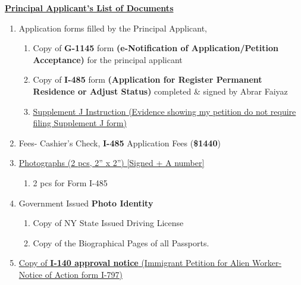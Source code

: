
\begin{center}
\underline{\textbf{Principal Applicant's List of Documents}}
\end{center}

\begin{enumerate}[label=\textbf{ Exhibit-\arabic*}]
    \item {Application forms filled by the Principal Applicant,}\begin{enumerate}[label=\roman*.]
        
        \item Copy of \textbf{G-1145} form \textbf{(e-Notification of Application/Petition Acceptance)} for the principal applicant
        
        \item Copy of \textbf{I-485} form \textbf{(Application for Register Permanent Residence or Adjust Status)} completed \& signed by Abrar Faiyaz
        \item \hyperref[exhibit1b]{Supplement J Instruction (Evidence showing my petition do not require filing Supplement J form)}
    \end{enumerate}
    \item Fees- Cashier's Check, \textbf{I-485} Application Fees (\textbf{\$1440})
    
    \item \hyperref[exhibit2]{Photographs (2 pcs, 2” x 2”) [Signed + A number]} \begin{enumerate}[label=\roman*.]
        \item {2 pcs for Form I-485}
    \end{enumerate}

     \item {Government Issued \textbf{Photo Identity}}\begin{enumerate}[label=\roman*.]
        \item Copy of NY State Issued Driving License
        \item Copy of the Biographical Pages of all Passports.
    \end{enumerate}
    
    \item \hyperref[exhibit1]{Copy of \textbf{ I-140 approval notice} (Immigrant Petition for Alien Worker- Notice of Action form I-797)}
    


\end{enumerate}
